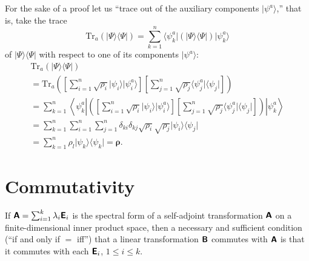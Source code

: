 {\color{OliveGreen}\bproof
For the sake of a proof let us ``trace out of the auxiliary components $\vert \psi^a\rangle$,'' that is,
take the trace
\begin{equation}
\textrm{Tr}_{a} (\vert \Psi\rangle \langle \Psi \vert )
=
\sum_{k=1}^n  \langle \psi^a_{k} \vert  (\vert \Psi\rangle \langle \Psi \vert ) \vert \psi^a_{k}\rangle
\end{equation}
of
$\vert \Psi\rangle \langle \Psi \vert$
with respect to one of its components $\vert \psi^a\rangle$:
\begin{equation}
\begin{split}
\textrm{Tr}_{a}\left(
\vert \Psi\rangle \langle \Psi \vert
\right)
\\=
\textrm{Tr}_{a}\left(
\left[\sum_{i=1}^n \sqrt{\rho_{i}}  \vert \psi_{i}\rangle  \vert \psi^a_{i}\rangle \right]
\left[\sum_{j=1}^n \sqrt{\rho_{j}}  \langle  \psi^a_{j}\vert \langle \psi_{j}\vert \right]
\right)
\\=
\sum_{k=1}^n  \left\langle \psi^a_{k} \left\vert  \left(
\left[\sum_{i=1}^n \sqrt{\rho_{i}}  \vert \psi_{i}\rangle  \vert \psi^a_{i}\rangle \right]
\left[\sum_{j=1}^n \sqrt{\rho_{j}}  \langle  \psi^a_{j}\vert \langle \psi_{j}\vert \right]
\right)
\right\vert \psi^a_{k}\right\rangle
\\=
\sum_{k=1}^n \sum_{i=1}^n \sum_{j=1}^n  \delta_{ki} \delta_{kj}
\sqrt{\rho_{i}} \sqrt{\rho_{j}}
\vert \psi_{i}\rangle
\langle \psi_{j}\vert
\\=
\sum_{k=1}^n
\rho_{l}
\vert \psi_{k}\rangle
\langle \psi_{k}\vert
= {\boldsymbol{\rho}}
.
\label{2015-puranproof1}
\end{split}
\end{equation}
}






\section{Commutativity}

If $\textsf{\textbf{A}}=\sum_{i=1}^k \lambda_i\textsf{\textbf{E}}_i$
is the spectral form of a self-adjoint transformation  $\textsf{\textbf{A}}$
on a finite-dimensional inner product space,
then a necessary and sufficient condition (``if and only if $=$ iff'')
that a linear transformation
 $\textsf{\textbf{B}}$ commutes with
 $\textsf{\textbf{A}}$
is that it commutes with each
$\textsf{\textbf{E}}_i$, $1\le i\le k$.

